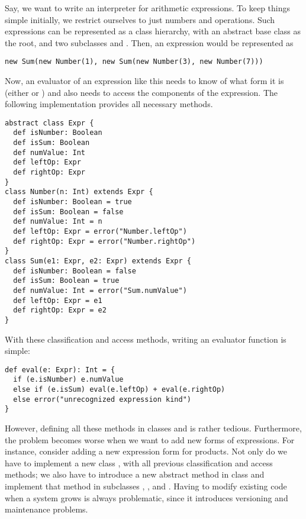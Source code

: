 Say, we want to write an interpreter for arithmetic expressions.  To
keep things simple initially, we restrict ourselves to just numbers
and \code{+} operations. Such expressions can be represented as a class hierarchy, with an abstract base class  as the root, and two subclasses  and
. Then, an expression  would be represented as
\begin{lstlisting}
new Sum(new Number(1), new Sum(new Number(3), new Number(7)))
\end{lstlisting}
Now, an evaluator of an expression like this needs to know of what
form it is (either  or ) and also needs to
access the components of the expression.  The following
implementation provides all necessary methods.
\begin{lstlisting}
abstract class Expr {
  def isNumber: Boolean
  def isSum: Boolean
  def numValue: Int
  def leftOp: Expr
  def rightOp: Expr
}
class Number(n: Int) extends Expr {
  def isNumber: Boolean = true
  def isSum: Boolean = false
  def numValue: Int = n
  def leftOp: Expr = error("Number.leftOp")
  def rightOp: Expr = error("Number.rightOp")
}
class Sum(e1: Expr, e2: Expr) extends Expr {
  def isNumber: Boolean = false
  def isSum: Boolean = true
  def numValue: Int = error("Sum.numValue")
  def leftOp: Expr = e1
  def rightOp: Expr = e2
}
\end{lstlisting}
With these classification and access methods, writing an evaluator function is simple:
\begin{lstlisting}
def eval(e: Expr): Int = {
  if (e.isNumber) e.numValue
  else if (e.isSum) eval(e.leftOp) + eval(e.rightOp)
  else error("unrecognized expression kind")
}
\end{lstlisting}
However, defining all these methods in classes  and
 is rather tedious. Furthermore, the problem becomes worse 
when we want to add new forms of expressions. For instance, consider
adding a new expression form
 for products. Not only do we have to implement a new class , with all previous classification and access methods; we also have to introduce a
new abstract method  in class  and
implement that method in subclasses , , and
. Having to modify existing code when a system grows is always problematic, since it introduces versioning and maintenance problems. 

